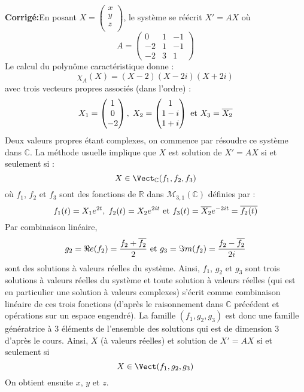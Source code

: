 \documentclass[a4paper,twoside,french,11pt]{VcCours}
\newcommand{\corr}{\textbf{Corrigé:}}
\begin{document}
\corr En posant $X = \begin{pmatrix}
x \\
y \\
z \\
\end{pmatrix}$, le système se réécrit $X'=AX$ où 
$$ A = \begin{pmatrix}
0 & 1 & -1 \\
-2 & 1 & -1 \\
-2 & 3 & 1 
\end{pmatrix}$$
Le calcul du polynôme caractéristique donne :
$$ \chi_A(X) = (X-2)(X-2i)(X+2i)$$
avec trois vecteurs propres associés (dans l'ordre) :
$$ X_1 = \begin{pmatrix}
1 \\
0 \\
-2
\end{pmatrix}, \; X_2 = \begin{pmatrix}
1 \\
1-i\\
1+i\\
\end{pmatrix} \hbox{ et }  X_3 = \overline{X_2} $$
Deux valeurs propres étant complexes, on commence par résoudre ce système dans $\mathbb{C}$. La méthode usuelle implique que $X$ est solution de $X'=AX$ si et seulement si :
$$X \in \Vect_{\mathbb{C}} (f_1,f_2,f_3)$$
où $f_1$, $f_2$ et $f_3$ sont des fonctions de $\mathbb{R}$ dans $\mathcal{M}_{3,1}(\mathbb{C})$ définies par :
$$ f_1(t)= X_1 e^{2t}, \; f_2(t) = X_2 e^{2it} \hbox{ et } f_3(t) = \overline{X_2} e^{-2i t} = \overline{f_2(t)}$$
Par combinaison linéaire,
$$ g_2=\Re e(f_2) = \dfrac{f_2+ \overline{f_2}}{2} \hbox{ et } g_3=\Im m(f_2) = \dfrac{f_2- \overline{f_2}}{2i}$$
sont des solutions à valeurs réelles du système. Ainsi, $f_1$, $g_2$ et $g_3$ sont trois solutions à valeurs réelles du système et toute solution à valeurs réelles (qui est en particulier une solution à valeurs complexes) s'écrit comme combinaison linéaire de ces trois fonctions (d'après le raisonnement dans $\mathbb{C}$ précédent et opérations sur un espace engendré). La famille $(f_1,g_2,g_3)$ est donc une famille génératrice à $3$ éléments de l'ensemble des solutions qui est de dimension $3$ d'après le cours. Ainsi, $X$ (à valeurs réelles) et solution de $X'=AX$ si et seulement si 
$$ X \in \Vect(f_1,g_2,g_3)$$
On obtient ensuite $x$, $y$ et $z$.
\end{document}
